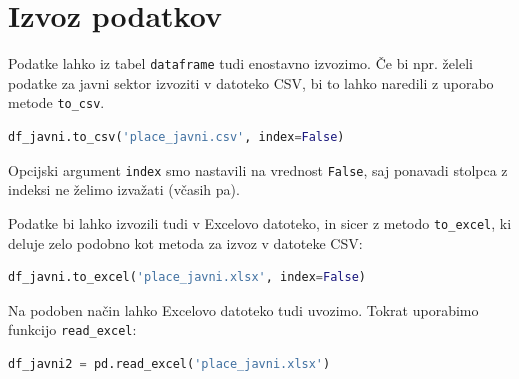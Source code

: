\section{Izvoz podatkov}

Podatke lahko iz tabel \texttt{dataframe} tudi enostavno izvozimo. Če bi npr. želeli podatke za javni sektor izvoziti v datoteko CSV, bi to lahko naredili z uporabo metode \texttt{to\_csv}.
\begin{lstlisting}[language=python]
df_javni.to_csv('place_javni.csv', index=False)
\end{lstlisting}
Opcijski argument \texttt{index} smo nastavili na vrednost \texttt{False}, saj ponavadi stolpca z indeksi ne želimo izvažati (včasih pa). 

Podatke bi lahko izvozili tudi v Excelovo datoteko, in sicer z metodo \texttt{to\_excel}, ki deluje zelo podobno kot metoda za izvoz v datoteke CSV:
\begin{lstlisting}[language=python]
df_javni.to_excel('place_javni.xlsx', index=False)
\end{lstlisting}
Na podoben način lahko Excelovo datoteko tudi uvozimo. Tokrat uporabimo funkcijo \texttt{read\_excel}:
\begin{lstlisting}[language=python]
df_javni2 = pd.read_excel('place_javni.xlsx')
\end{lstlisting}
